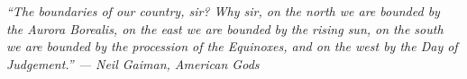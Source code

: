 \documentclass[
	article,			%
	11pt,				%
	oneside,			%
	a4paper,			%
	english,			%
	brazil,				%
	]{abntex2}
\begin{document}

%
% 
%
\begin{folhadeaprovacao}

  \begin{center}
    {\ABNTEXchapterfont\large\imprimirautor}

    \vspace*{\fill}\vspace*{\fill}
    \begin{center}
      \ABNTEXchapterfont\bfseries\Large\imprimirtitulo
    \end{center}
    \vspace*{\fill}
    
    \hspace{.45\textwidth}
    \begin{minipage}{.5\textwidth}
        \imprimirpreambulo
    \end{minipage}%
    \vspace*{\fill}
   \end{center}
        
   

      
   \begin{center}
    \vspace*{0.5cm}
    {\large\imprimirlocal}
    \par
    {\large\imprimirdata}
    \vspace*{1cm}
  \end{center}
  
\end{folhadeaprovacao}

\pagebreak
\begin{dedicatoria}
   \vspace*{\fill}
   \centering
   \noindent
   \textit{ ``The boundaries of our country, sir? Why sir, on the north we are bounded by the Aurora Borealis, on the east we are bounded by the rising sun, on the south we are bounded by the procession of the Equinoxes, and on the west by the Day of Judgement.'' 	
	— Neil Gaiman, American Gods } \vspace*
	{\fill}
\end{dedicatoria}
\end{document}
